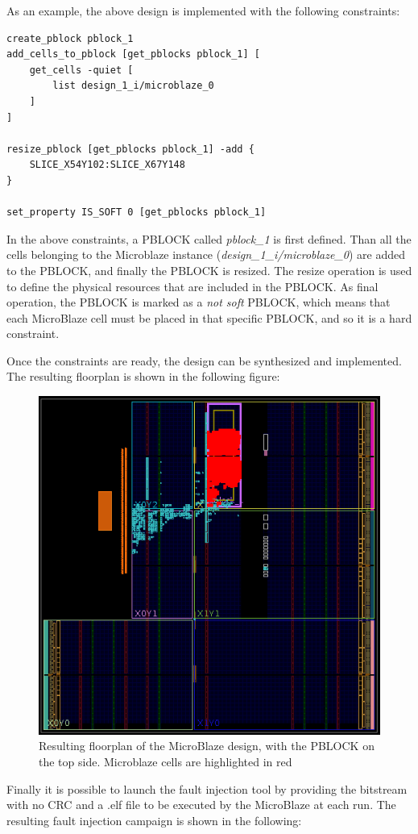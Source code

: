 As an example, the above design is implemented with the following constraints:

\begin{lstlisting}[style=tcl]
create_pblock pblock_1
add_cells_to_pblock [get_pblocks pblock_1] [
    get_cells -quiet [
        list design_1_i/microblaze_0
    ]
]

resize_pblock [get_pblocks pblock_1] -add {
    SLICE_X54Y102:SLICE_X67Y148
}

set_property IS_SOFT 0 [get_pblocks pblock_1]
\end{lstlisting}

In the above constraints, a PBLOCK called \textit{pblock\_1} is first defined. Than all the cells belonging to the Microblaze instance (\textit{design\_1\_i/microblaze\_0}) are added to the PBLOCK, and finally the PBLOCK is resized. The resize operation is used to define the physical resources that are included in the PBLOCK. As final operation, the PBLOCK is marked as a \textit{not soft} PBLOCK, which means that each MicroBlaze cell must be placed in that specific PBLOCK, and so it is a hard constraint.\bigskip

Once the constraints are ready, the design can be synthesized and implemented. The resulting floorplan is shown in the following figure:

\begin{figure}[H]
\centering
\includegraphics[width=0.7\linewidth]{images/chapter4/impl.png}
\caption{Resulting floorplan of the MicroBlaze design, with the PBLOCK on the top side. Microblaze cells are highlighted in red}
\end{figure}

Finally it is possible to launch the fault injection tool by providing the bitstream with no CRC and a .elf file to be executed by the MicroBlaze at each run. The resulting fault injection campaign is shown in the following:

